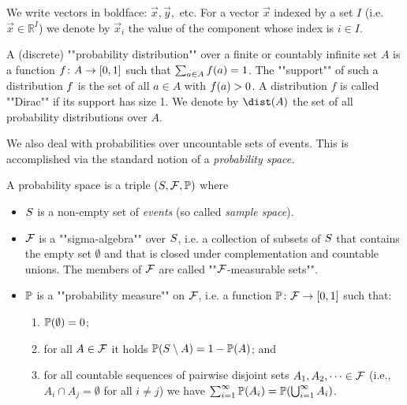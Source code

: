 We write vectors in boldface: $ \vec{x}, \vec{y}, $ etc. For a vector $ \vec{x} $ indexed by a set $ I $ (i.e. $ \vec{x}\in \mathbb{R}^I $) we denote by $ \vec{x}_i $ the value of the component whose index is  $i\in I  $. 

A (discrete) ""probability distribution"" over a finite or countably infinite set $A$ is a function $f \colon A \rightarrow [0,1]$ such that $\sum_{a\in A}f(a)=1$. The ""support"" of such a distribution $f$ is the set of all $a\in A$ with $f(a)>0$. A distribution $f$ is called ""Dirac"" if its support has size 1.
We denote by $\dist(A)$ the set of all probability distributions over $A$.


We also deal with probabilities over uncountable sets of events. This is accomplished via the standard notion of a \emph{probability space.}

\begin{definition}
\label{5-def:probspace}
A probability space is a triple
$(S,\mathcal{F},\mathbb{P})$ where
\begin{itemize}
\item $S$ is a non-empty set of \emph{events} (so called
\emph{sample space}). 

\item $\mathcal{F}$ is a ""sigma-algebra"" over $S$,
i.e. a collection of subsets of $S$ that contains the empty set
$\emptyset$ and that is closed under complementation and countable unions. The members of $\mathcal{F}$ are called ""$\mathcal{F}$-measurable 
sets"".

\item $\mathbb{P}$ is a ""probability measure"" on $\mathcal{F}$, i.e. a function
$\mathbb{P}\colon \mathcal{F}\rightarrow[0,1]$ such that:
\begin{enumerate}
\item $\mathbb{P}(\emptyset)=0$;

\item for all $A\in \mathcal{F}$ it holds $\mathbb{P}(S \setminus
A)=1-\mathbb{P}(A)$; and

\item for all countable sequences of pairwise disjoint sets $A_1,A_2,\dots \in \mathcal{F}$ (i.e., $A_i \cap A_j = \emptyset$ for all $i\neq j$)
we have $\sum_{i=1}^{\infty}\mathbb{P}(A_i)=\mathbb{P}(\bigcup_{i=1}^{\infty} A_i)$.
\end{enumerate}
\end{itemize}
\end{definition}

